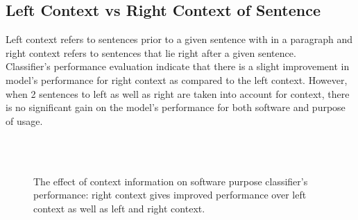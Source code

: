 \subsection{Left Context vs Right Context of Sentence}
\label{sec:chapter06:leftvsright}

Left context refers to sentences prior to a given sentence with in  a paragraph and right context refers to sentences that lie right after a given sentence. \\

Classifier’s performance evaluation indicate that there is a slight improvement in model’s performance for right context as compared to the left context. However, when 2 sentences to left as well as right are taken into account for context, there is no significant gain on the model’s performance for both software and purpose of usage. \\

\begin{figure}[h]
	
	\myfloatalign
	
	 \\
	\\
	\caption[Subfloat - Figure]{The effect of context information on software purpose classifier's performance: right context gives improved performance over left context as well as left and right context.}
\end{figure}

